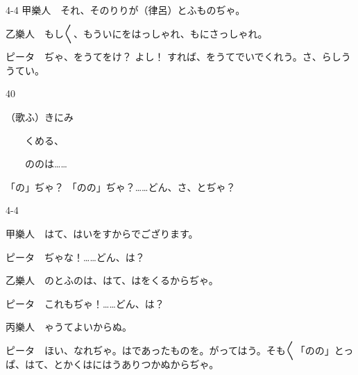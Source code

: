 \documentclass[tate,paper=b6j,jafontsize=9pt]{jlreq}
\begin{document}
\begin{azconvIndented}{4\zw}{-4\zw}
甲樂人　それ、そのりりが（律呂）とふものぢゃ。

乙樂人　もし{〳〵}、もういにをはっしゃれ、もにさっしゃれ。

ピータ　ぢゃ、をうてをけ？ よし！ すれば、をうてでいでくれう。さ、らしううてい。

\end{azconvIndented}
\begin{azconvIndented}{4\zw}{0\zw}

（歌ふ）きにみ

　　くめる、

　　ののは……

「の」ぢゃ？ 「のの」ぢゃ？……どん、さ、とぢゃ？

\end{azconvIndented}
\begin{azconvIndented}{4\zw}{-4\zw}

甲樂人　はて、はいをすからでござります。

ピータ　ぢゃな！……どん、は？

乙樂人　のとふのは、はて、はをくるからぢゃ。

ピータ　これもぢゃ！……どん、は？

丙樂人　ゃうてよいからぬ。

ピータ　ほい、なれぢゃ。はであったものを。がってはう。そも{〳〵}「のの」とっぱ、はて、とかくはにはうありつかぬからぢゃ。

\end{azconvIndented}
\end{document}
